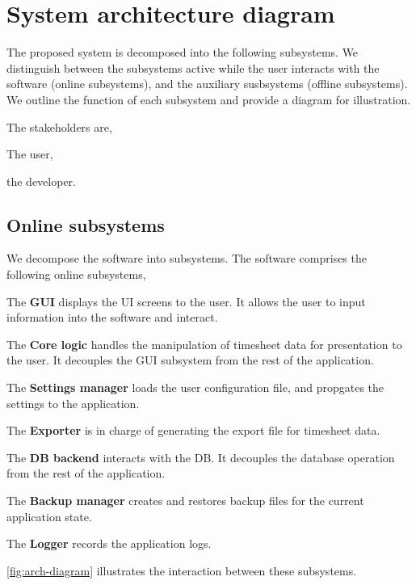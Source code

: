 \section{System architecture diagram}
The proposed system is decomposed into the following subsystems. We distinguish
between the subsystems active while the user interacts with the software (online
subsystems), and the auxiliary susbsystems (offline subsystems). We outline
the function of each subsystem and provide a diagram for illustration.

The stakeholders are,
\begin{compactitem}
\item The user,
\item the developer.
\end{compactitem}

\subsection{Online subsystems}
We decompose the software into subsystems.
The software comprises the following online subsystems,
\begin{compactitem}
\item The \textbf{\gls{GUI}} displays the \gls{UI} screens to the user. It
  allows the user to input information into the software and interact.
\item The \textbf{Core logic} handles the manipulation of timesheet data for
  presentation to the user. It decouples the GUI subsystem from the rest
  of the application.
\item The \textbf{Settings manager} loads the user configuration file, and
  propgates the settings to the application.
\item The \textbf{Exporter} is in charge of generating the export file
  for timesheet data.
\item The \textbf{\gls{DB} backend} interacts with the \gls{DB}. It decouples
  the database operation from the rest of the application.
\item The \textbf{Backup manager} creates and restores backup files for the
  current application state.
\item The \textbf{Logger} records the application logs.
\end{compactitem}

\cref{fig:arch-diagram} illustrates the interaction between these
subsystems.

